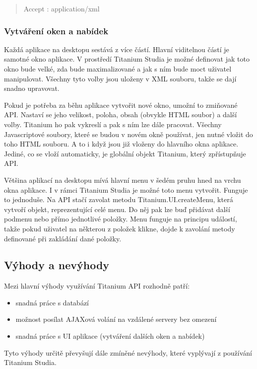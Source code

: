 \begin{quote}
Accept : application\slash xml
\end{quote}

\subsubsection{Vytváření oken a nabídek}

Každá aplikace na desktopu sestává z více částí. Hlavní viditelnou částí je samotné okno aplikace. V prostředí Titanium Studia je možné definovat jak toto okno bude velké, zda bude maximalizované a jak s ním bude moct uživatel manipulovat. Všechny tyto volby jsou uloženy v XML souboru, takže se dají snadno upravovat.

Pokud je potřeba za běhu aplikace vytvořit nové okno, umožní to zmiňované API. Nastaví se jeho velikost, poloha, obsah (obvykle HTML soubor) a další volby. Titanium ho pak vykreslí a pak s ním lze dále pracovat. Všechny Javascriptové soubory, které se budou v novém okně používat, jen nutné vložit do toho HTML souboru. A to i když jsou již vloženy do hlavního okna aplikace. Jediné, co se vloží automaticky, je globální objekt Titanium, který zpřístupňuje API.

Většina aplikací na desktopu mívá hlavní menu v šedém pruhu hned na vrchu okna aplikace. I v rámci Titanium Studia je možné toto menu vytvořit. Funguje to jednoduše. Na API stačí zavolat metodu Titanium.UI.createMenu, která vytvoří objekt, reprezentující celé menu. Do něj pak lze buď přidávat další podmenu nebo přímo jednotlivé položky. Menu funguje na principu událostí, takže pokud uživatel na některou z položek klikne, dojde k zavolání metody definované při zakládání dané položky.

\subsection{Výhody a nevýhody}

Mezi hlavní výhody využívání Titanium API rozhodně patří:

\begin{itemize}
\item snadná práce s databází
\item možnost posílat AJAXová volání na vzdálené servery bez omezení
\item snadná práce s UI aplikace (vytváření dalších oken a nabídek)
\end{itemize}

Tyto výhody určitě převyšují dále zmíněné nevýhody, které vyplývají z používání Titanium Studia.

